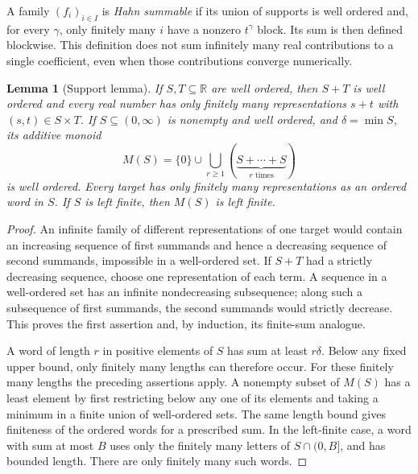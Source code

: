 \documentclass[11pt,a4paper]{article}
\newtheorem{lemma}[theorem]{Lemma}
\theoremstyle{definition}
\theoremstyle{remark}
\newcommand{\R}{\mathbb R}
\begin{document}
A family $(f_i)_{i\in I}$ is \emph{Hahn summable} if its union of supports is
well ordered and, for every $\gamma$, only finitely many $i$ have a nonzero
$t^\gamma$ block. Its sum is then defined blockwise. This definition does not
sum infinitely many real contributions to a single coefficient, even when
those contributions converge numerically.

\begin{lemma}[Support lemma]\label{lem:support}
If $S,T\subseteq\R$ are well ordered, then $S+T$ is well ordered and every
real number has only finitely many representations $s+t$ with
$(s,t)\in S\times T$. If $S\subseteq(0,\infty)$ is nonempty and well ordered,
and $\delta=\min S$, its additive monoid
\[
 M(S)=\{0\}\cup\bigcup_{r\ge1}(\underbrace{S+\cdots+S}_{r\text{ times}})
\]
is well ordered. Every target has only finitely many representations as an
ordered word in $S$. If $S$ is left finite, then $M(S)$ is left finite.
\end{lemma}
\begin{proof}
An infinite family of different representations of one target would contain
an increasing sequence of first summands and hence a decreasing sequence of
second summands, impossible in a well-ordered set. If $S+T$ had a strictly
decreasing sequence, choose one representation of each term. A sequence in a
well-ordered set has an infinite nondecreasing subsequence; along such a
subsequence of first summands, the second summands would strictly decrease.
This proves the first assertion and, by induction, its finite-sum analogue.

A word of length $r$ in positive elements of $S$ has sum at least $r\delta$.
Below any fixed upper bound, only finitely many lengths can therefore occur.
For these finitely many lengths the preceding assertions apply. A nonempty
subset of $M(S)$ has a least element by first restricting below any one of
its elements and taking a minimum in a finite union of well-ordered sets.
The same length bound gives finiteness of the ordered words for a prescribed
sum. In the left-finite case, a word with sum at most $B$ uses only the
finitely many letters of $S\cap(0,B]$, and has bounded length. There are only
finitely many such words.
\end{proof}
\end{document}
